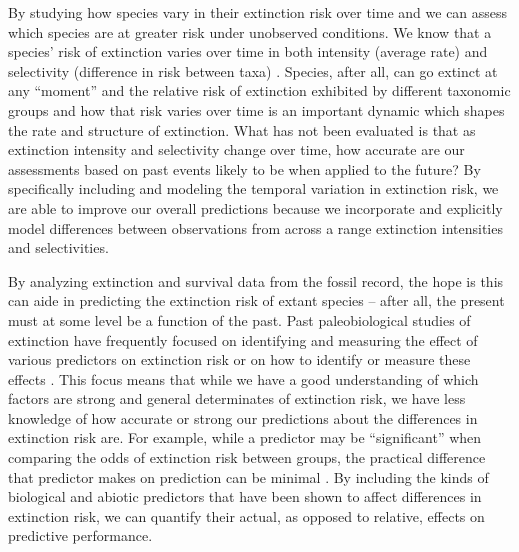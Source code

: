 \documentclass[12pt,letterpaper]{article}
\begin{document}
By studying how species vary in their extinction risk over time and we can assess which species are at greater risk under unobserved conditions. We know that a species' risk of extinction varies over time in both intensity (average rate) and selectivity (difference in risk between taxa) \citep{Payne2007,Payne2016,Ezard2011}. Species, after all, can go extinct at any ``moment'' and the relative risk of extinction exhibited by different taxonomic groups and how that risk varies over time is an important dynamic which shapes the rate and structure of extinction. What has not been evaluated is that as extinction intensity and selectivity change over time, how accurate are our assessments based on past events likely to be when applied to the future? By specifically including and modeling the temporal variation in extinction risk, we are able to improve our overall predictions because we incorporate and explicitly model differences between observations from across a range extinction intensities and selectivities.

By analyzing extinction and survival data from the fossil record, the hope is this can aide in predicting the extinction risk of extant species -- after all, the present must at some level be a function of the past. Past paleobiological studies of extinction have frequently focused on identifying and measuring the effect of various predictors on extinction risk \citep{Harnik2011,Smits2015,Peters2008,Payne2007,Harnik2012,Ezard2011,Foote2006} or on how to identify or measure these effects \citep{Alroy2010,Alroy2014,Alroy2001,Alroy2000,Alroy2000b,Foote2001}. This focus means that while we have a good understanding of which factors are strong and general determinates of extinction risk, we have less knowledge of how accurate or strong our predictions about the differences in extinction risk are. For example, while a predictor may be ``significant'' when comparing the odds of extinction risk between groups, the practical difference that predictor makes on prediction can be minimal \citep{ARM}. By including the kinds of biological and abiotic predictors that have been shown to affect differences in extinction risk, we can quantify their actual, as opposed to relative, effects on predictive performance.
\end{document}

